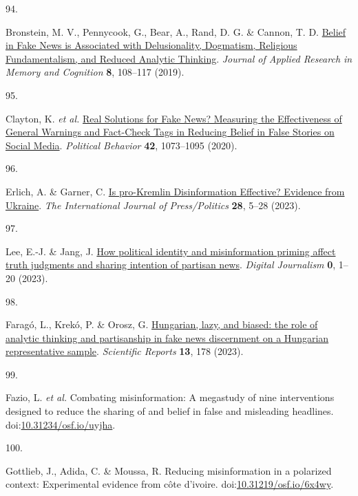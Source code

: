 \documentclass[
  man]{apa6}
\newlength{\cslhangindent}
\newlength{\csllabelwidth}
\newenvironment{CSLReferences}[2] %
 {\begin{list}{}{%
  \setlength{\itemindent}{0pt}
  \setlength{\leftmargin}{0pt}
  \setlength{\parsep}{0pt}
  \ifodd #1
   \setlength{\leftmargin}{\cslhangindent}
   \setlength{\itemindent}{-1\cslhangindent}
  \fi
  \setlength{\itemsep}{#2\baselineskip}}}
 {\end{list}}
\newcommand{\CSLLeftMargin}[1]{\parbox[t]{\csllabelwidth}{\strut#1\strut}}
\newcommand{\CSLRightInline}[1]{\parbox[t]{\linewidth - \csllabelwidth}{\strut#1\strut}}
\begin{document}
\begin{CSLReferences}{0}{0}
\CSLLeftMargin{94. }%
\CSLRightInline{*Bronstein, M. V., Pennycook, G., Bear, A., Rand, D. G. \& Cannon, T. D. \href{https://doi.org/10.1016/j.jarmac.2018.09.005}{Belief in Fake News is Associated with Delusionality, Dogmatism, Religious Fundamentalism, and Reduced Analytic Thinking}. \emph{Journal of Applied Research in Memory and Cognition} \textbf{8}, 108--117 (2019).}

\CSLLeftMargin{95. }%
\CSLRightInline{*Clayton, K. \emph{et al.} \href{https://doi.org/10.1007/s11109-019-09533-0}{Real Solutions for Fake News? Measuring the Effectiveness of General Warnings and Fact-Check Tags in Reducing Belief in False Stories on Social Media}. \emph{Political Behavior} \textbf{42}, 1073--1095 (2020).}

\CSLLeftMargin{96. }%
\CSLRightInline{*Erlich, A. \& Garner, C. \href{https://doi.org/10.1177/19401612211045221}{Is pro-Kremlin Disinformation Effective? Evidence from Ukraine}. \emph{The International Journal of Press/Politics} \textbf{28}, 5--28 (2023).}

\CSLLeftMargin{97. }%
\CSLRightInline{*Lee, E.-J. \& Jang, J. \href{https://doi.org/10.1080/21670811.2022.2163413}{How political identity and misinformation priming affect truth judgments and sharing intention of partisan news}. \emph{Digital Journalism} \textbf{0}, 1--20 (2023).}

\CSLLeftMargin{98. }%
\CSLRightInline{*Faragó, L., Krekó, P. \& Orosz, G. \href{https://doi.org/10.1038/s41598-022-26724-8}{Hungarian, lazy, and biased: the role of analytic thinking and partisanship in fake news discernment on a Hungarian representative sample}. \emph{Scientific Reports} \textbf{13}, 178 (2023).}

\CSLLeftMargin{99. }%
\CSLRightInline{*Fazio, L. \emph{et al.} Combating misinformation: A megastudy of nine interventions designed to reduce the sharing of and belief in false and misleading headlines. doi:\href{https://doi.org/10.31234/osf.io/uyjha}{10.31234/osf.io/uyjha}.}

\CSLLeftMargin{100. }%
\CSLRightInline{*Gottlieb, J., Adida, C. \& Moussa, R. Reducing misinformation in a polarized context: Experimental evidence from côte d{'}ivoire. doi:\href{https://doi.org/10.31219/osf.io/6x4wy}{10.31219/osf.io/6x4wy}.}


\end{CSLReferences}
\end{document}
